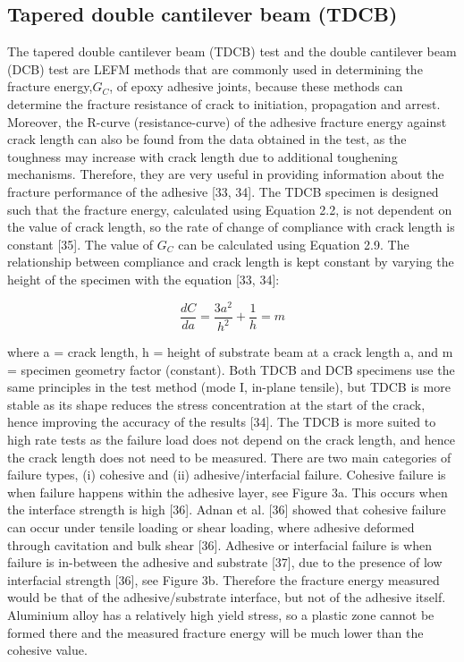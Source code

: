 \documentclass[numbers=noendperiod,chapterprefix=on]{icldt} %
\begin{document}
\subsection{Tapered double cantilever beam (TDCB)}
The tapered double cantilever beam (TDCB) test and the double cantilever beam (DCB) test are LEFM methods that are commonly used in determining the fracture energy,$G_C$, of epoxy adhesive joints, because these methods can determine the fracture resistance of crack to initiation, propagation and arrest. Moreover, the R-curve (resistance-curve) of the adhesive fracture energy against crack length can also be found from the data obtained in the test, as the toughness may increase with crack length due to additional toughening mechanisms. Therefore, they are very useful in providing information about the fracture performance of the adhesive [33, 34]. 
The TDCB specimen is designed such that the fracture energy, calculated using Equation 2.2, is not dependent on the value of crack length, so the rate of change of compliance with crack length is constant [35]. The value of $G_C$ can be calculated using Equation 2.9. The relationship between compliance and crack length is kept constant by varying the height of the specimen with the equation [33, 34]:

\begin{equation} 
\frac{dC}{da}=\frac{3a^2}{h^2}+\frac{1}{h}=m
\end{equation}

where a = crack length, h = height of substrate beam at a crack length a, and m = specimen geometry factor (constant). 
Both TDCB and DCB specimens use the same principles in the test method (mode I, in-plane tensile), but TDCB is more stable as its shape reduces the stress concentration at the start of the crack, hence improving the accuracy of the results [34]. The TDCB is more suited to high rate tests as the failure load does not depend on the crack length, and hence the crack length does not need to be measured. 
There are two main categories of failure types, (i) cohesive and (ii) adhesive/interfacial failure.
Cohesive failure is when failure happens within the adhesive layer, see Figure 3a. This occurs when the interface strength is high [36]. Adnan et al. [36] showed that cohesive failure can occur under tensile loading or shear loading, where adhesive deformed through cavitation and bulk shear [36]. 
Adhesive or interfacial failure is when failure is in-between the adhesive and substrate [37], due to the presence of low interfacial strength [36], see Figure 3b. Therefore the fracture energy measured would be that of the adhesive/substrate interface, but not of the adhesive itself. Aluminium alloy has a relatively high yield stress, so a plastic zone cannot be formed there and the measured fracture energy will be much lower than the cohesive value. 
\end{document}
